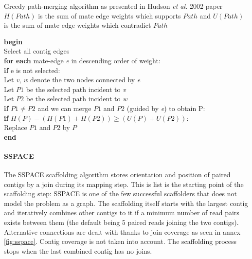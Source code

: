 \documentclass[12pt]{article}
\begin{document}
\begin{algorithm}[h!]
\caption{Greedy path-merging algorithm as presented in Hudson \textit{et al.} 2002 paper \\ \footnotesize $H(Path)$ is the sum of mate edge weights which supports $Path$ and $U(Path)$ is the sum of mate edge weights which contradict $Path$}
\textbf{begin} \\
Select all contig edges \\
\textbf{for each} mate-edge \textit{e} in descending order of weight: \\
\hspace*{1cm}\textbf{if} e is not selected: \\
\hspace*{2cm}Let \textit{v}, \textit{w} denote the two nodes connected by \textit{e} \\
\hspace*{2cm}Let $P1$ be the selected path incident to \textit{v} \\
\hspace*{2cm}Let $P2$ be the selected path incident to \textit{w} \\
\hspace*{2cm}\textbf{if} $P1 \neq P2$ and we can merge $P1$ and $P2$ (guided by \textit{e}) to obtain P: \\
\hspace*{3cm}\textbf{if} $H(P) - (H(P1) + H(P2)) \geq (U(P)+U(P2))$: \\
\hspace*{4cm}Replace $P1$ and $P2$ by $P$ \\
\textbf{end}
\end{algorithm}

\paragraph*{SSPACE} \cite{boetzer_scaffolding_2011}
The SSPACE scaffolding algorithm stores orientation and position of paired contigs by a join during its mapping step. This is list is the starting point of the scaffolding step: SSPACE is one of the few successful scaffolders that does not model the problem as a graph. The scaffolding itself starts with the largest contig and iteratively combines other contigs to it if a minimum number of read pairs exists between them (the default being 5 paired reads joining the two contigs). Alternative connections are dealt with thanks to join coverage as seen in annex \ref{fig:sspace}. Contig coverage is not taken into account. The scaffolding process stops when the last combined contig has no joins.
\end{document}
